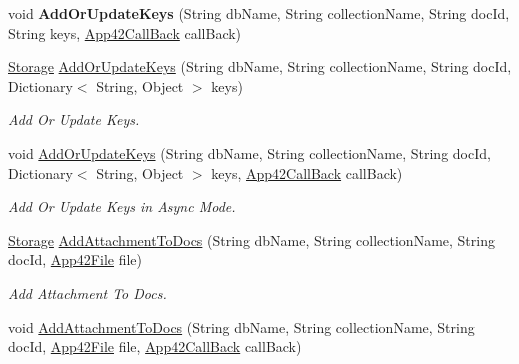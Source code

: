 \begin{DoxyCompactItemize}
\item 
\hypertarget{classcom_1_1shephertz_1_1app42_1_1paas_1_1sdk_1_1csharp_1_1storage_1_1_storage_service_aa3d2207a0889faaf23bc8955cf02fed3}{void {\bfseries Add\+Or\+Update\+Keys} (String db\+Name, String collection\+Name, String doc\+Id, String keys, \hyperlink{interfacecom_1_1shephertz_1_1app42_1_1paas_1_1sdk_1_1csharp_1_1_app42_call_back}{App42\+Call\+Back} call\+Back)}\label{classcom_1_1shephertz_1_1app42_1_1paas_1_1sdk_1_1csharp_1_1storage_1_1_storage_service_aa3d2207a0889faaf23bc8955cf02fed3}

\item 
\hyperlink{classcom_1_1shephertz_1_1app42_1_1paas_1_1sdk_1_1csharp_1_1storage_1_1_storage}{Storage} \hyperlink{classcom_1_1shephertz_1_1app42_1_1paas_1_1sdk_1_1csharp_1_1storage_1_1_storage_service_aa6a35afbf6b2095fbf5fc50a18ac03b2}{Add\+Or\+Update\+Keys} (String db\+Name, String collection\+Name, String doc\+Id, Dictionary$<$ String, Object $>$ keys)
\begin{DoxyCompactList}\small\item\em Add Or Update Keys. \end{DoxyCompactList}\item 
void \hyperlink{classcom_1_1shephertz_1_1app42_1_1paas_1_1sdk_1_1csharp_1_1storage_1_1_storage_service_a1b8d0e967f9bd5915f17856a9d74e63f}{Add\+Or\+Update\+Keys} (String db\+Name, String collection\+Name, String doc\+Id, Dictionary$<$ String, Object $>$ keys, \hyperlink{interfacecom_1_1shephertz_1_1app42_1_1paas_1_1sdk_1_1csharp_1_1_app42_call_back}{App42\+Call\+Back} call\+Back)
\begin{DoxyCompactList}\small\item\em Add Or Update Keys in Async Mode. \end{DoxyCompactList}\item 
\hyperlink{classcom_1_1shephertz_1_1app42_1_1paas_1_1sdk_1_1csharp_1_1storage_1_1_storage}{Storage} \hyperlink{classcom_1_1shephertz_1_1app42_1_1paas_1_1sdk_1_1csharp_1_1storage_1_1_storage_service_a977df3a6302058658ba4fd98b2d4b890}{Add\+Attachment\+To\+Docs} (String db\+Name, String collection\+Name, String doc\+Id, \hyperlink{classcom_1_1shephertz_1_1app42_1_1paas_1_1sdk_1_1csharp_1_1_app42_file}{App42\+File} file)
\begin{DoxyCompactList}\small\item\em Add Attachment To Docs. \end{DoxyCompactList}\item 
void \hyperlink{classcom_1_1shephertz_1_1app42_1_1paas_1_1sdk_1_1csharp_1_1storage_1_1_storage_service_a0ff4726f6e1dda22434d3c3f5b245b85}{Add\+Attachment\+To\+Docs} (String db\+Name, String collection\+Name, String doc\+Id, \hyperlink{classcom_1_1shephertz_1_1app42_1_1paas_1_1sdk_1_1csharp_1_1_app42_file}{App42\+File} file, \hyperlink{interfacecom_1_1shephertz_1_1app42_1_1paas_1_1sdk_1_1csharp_1_1_app42_call_back}{App42\+Call\+Back} call\+Back)

\end{DoxyCompactItemize}
